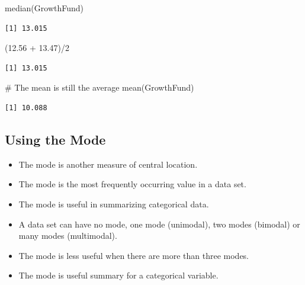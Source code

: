 \documentclass[
  letterpaper,
  DIV=11,
  numbers=noendperiod]{scrreprt}
\newenvironment{Shaded}{\begin{snugshade}}{\end{snugshade}}
\newcommand{\CommentTok}[1]{\textcolor[rgb]{0.37,0.37,0.37}{#1}}
\newcommand{\DecValTok}[1]{\textcolor[rgb]{0.68,0.00,0.00}{#1}}
\newcommand{\FloatTok}[1]{\textcolor[rgb]{0.68,0.00,0.00}{#1}}
\newcommand{\FunctionTok}[1]{\textcolor[rgb]{0.28,0.35,0.67}{#1}}
\newcommand{\NormalTok}[1]{\textcolor[rgb]{0.00,0.23,0.31}{#1}}
\newcommand{\SpecialCharTok}[1]{\textcolor[rgb]{0.37,0.37,0.37}{#1}}
\providecommand{\tightlist}{%
  \setlength{\itemsep}{0pt}\setlength{\parskip}{0pt}}\usepackage{longtable,booktabs,array}
\begin{document}
\begin{Shaded}
\begin{Highlighting}[]
\FunctionTok{median}\NormalTok{(GrowthFund)}
\end{Highlighting}
\end{Shaded}

\begin{verbatim}
[1] 13.015
\end{verbatim}

\begin{Shaded}
\begin{Highlighting}[]
\NormalTok{(}\FloatTok{12.56} \SpecialCharTok{+} \FloatTok{13.47}\NormalTok{)}\SpecialCharTok{/}\DecValTok{2}
\end{Highlighting}
\end{Shaded}

\begin{verbatim}
[1] 13.015
\end{verbatim}

\begin{Shaded}
\begin{Highlighting}[]
\CommentTok{\# The mean is still the average}
\FunctionTok{mean}\NormalTok{(GrowthFund)}
\end{Highlighting}
\end{Shaded}

\begin{verbatim}
[1] 10.088
\end{verbatim}

\subsection{Using the Mode}\label{using-the-mode}

\begin{itemize}
\tightlist
\item
  The mode is another measure of central location.
\item
  The mode is the most frequently occurring value in a data set.
\item
  The mode is useful in summarizing categorical data.
\item
  A data set can have no mode, one mode (unimodal), two modes (bimodal)
  or many modes (multimodal).
\item
  The mode is less useful when there are more than three modes.
\item
  The mode is useful summary for a categorical variable.
\end{itemize}
\end{document}
